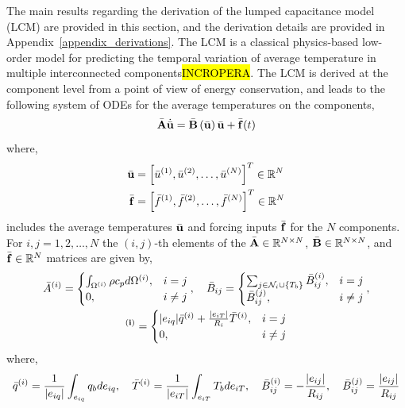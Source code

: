The main results regarding the derivation of the lumped capacitance model (LCM) are provided in this section, and the derivation details are provided in Appendix~\ref{appendix_derivations}. The LCM is a classical physics-based low-order model for predicting the temporal variation of average temperature in multiple interconnected components\hl{INCROPERA}. The LCM is derived at the component level from a point of view of energy conservation, and leads to the following system of ODEs for the average temperatures on the components,
\begin{equation}
    \bar{\mathbf{A}}\dot{\bar{\mathbf{u}}} = \bar{\mathbf{B}}\left(\bar{\mathbf{u}}\right)\bar{\mathbf{u}} + \bar{\mathbf{f}}(t)\label{eqn_lcm}
\end{equation}
where,
\begin{subequations}
    \begin{align}
       \bar{\mathbf{u}} &= \left[\bar{u}^{(1)},\bar{u}^{(2)},\dots,\bar{u}^{(N)}\right]^T\in\mathbb{R}^{N}\\
        \bar{\mathbf{f}} &= \left[\bar{f}^{(1)},\bar{f}^{(2)},\dots,\bar{f}^{(N)}\right]^T\in\mathbb{R}^{N}
    \end{align}
\end{subequations}
includes the average temperatures $\bar{\mathbf{u}}$ and forcing inputs $\bar{\mathbf{f}}$ for the $N$ components. For $i,j=1,2,\dots,N$ the $(i,j)$-th elements of the $\bar{\mathbf{A}}\in\mathbb{R}^{N\times N}$, $\bar{\mathbf{B}}\in\mathbb{R}^{N\times N}$, and $\bar{\mathbf{f}}\in\mathbb{R}^{N}$ matrices are given by,
\begin{subequations}
    \begin{gather}
        \bar{A}^{(i)} = \begin{cases}
                \int_{\Omega^{(i)}}\rho c_p d\Omega^{(i)}, & i=j\\
                0, & i\neq j
            \end{cases},\quad \bar{B}_{ij} = \begin{cases}
            \sum_{j\in\mathcal{N}_i\cup\left\{T_b\right\}}\bar{B}^{(i)}_{ij}, &i=j \\
            \bar{B}^{(j)}_{ij}, & i\neq j
        \end{cases},\\ \bf^{(i)} = \begin{cases}
            |e_{iq}|\bar{q}^{(i)} + \frac{|e_{iT}|}{R_{i}}\bar{T}^{(i)}, & i=j \\ 
            0, & i\neq j
        \end{cases}
    \end{gather}\label{eqn_lcm_matrices}
\end{subequations}
where,
\begin{equation}
    \bar{q}^{(i)} = \frac{1}{|e_{iq}|}\int_{e_{iq}} q_b de_{iq},\quad \bar{T}^{(i)} = \frac{1}{|e_{iT}|}\int_{e_{iT}}T_b de_{iT},\quad \bar{B}^{(i)}_{ij} = -\frac{|e_{ij}|}{R_{ij}},\quad \bar{B}_{ij}^{(j)} = \frac{|e_{ij}|}{R_{ij}}\label{eqn_lcm_matrices_elements}
\end{equation}

